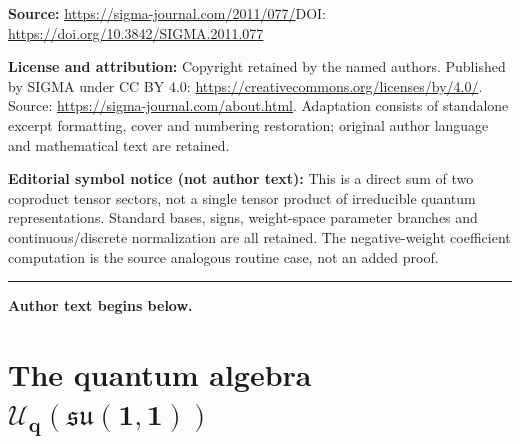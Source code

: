 \documentclass[11pt]{article}
\numberwithin{equation}{section}
\numberwithin{theorem}{section}
\numberwithin{proposition}{section}
\numberwithin{lemma}{section}
\numberwithin{corollary}{section}
\numberwithin{definition}{section}
\numberwithin{example}{section}
\numberwithin{remark}{section}
\numberwithin{note}{section}
\newcommand{\su}{\mathfrak{su}}
\newcommand{\U}{\mathcal U}
\begin{document}
\noindent\textbf{Source:} \url{https://sigma-journal.com/2011/077/}\quad DOI: \url{https://doi.org/10.3842/SIGMA.2011.077}\par
\noindent\textbf{License and attribution:} Copyright retained by the named authors. Published by SIGMA under CC BY 4.0: \url{https://creativecommons.org/licenses/by/4.0/}. Source: \url{https://sigma-journal.com/about.html}. Adaptation consists of standalone excerpt formatting, cover and numbering restoration; original author language and mathematical text are retained.\par
\noindent\textbf{Editorial symbol notice (not author text):} This is a direct sum of two coproduct tensor sectors, not a single tensor product of irreducible quantum representations. Standard bases, signs, weight-space parameter branches and continuous/discrete normalization are all retained. The negative-weight coefficient computation is the source analogous routine case, not an added proof.\par
\medskip\hrule\medskip\noindent\textbf{Author text begins below.}\par
\setcounter{section}{1}
\setcounter{subsection}{0}
\setcounter{subsubsection}{0}
\setcounter{equation}{0}
\section[The quantum algebra $\U_q(\su(1,1))$]{The quantum algebra $\boldsymbol{\U_q(\su(1,1))}$} \label{sec:Uq}
\end{document}
